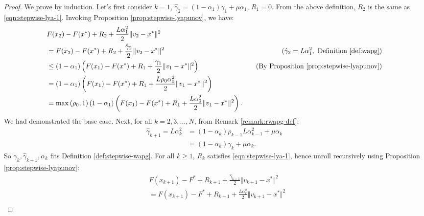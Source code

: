 \documentclass[12pt]{article}
\begin{document}
    \begin{proof}
        We prove by induction.
        Let's first consider $k = 1$, $\hat \gamma_2 = (1 - \alpha_1)\gamma_1 + \mu \alpha_1$, $R_1 = 0$.
        From the above definition, $R_2$ is the same as \eqref{eqn:stepwise-lya-1}.
        Invoking Proposition \ref{prop:stepwise-lyapunov}, we have:
        \begin{align*}
            & F(x_{2}) - F(x^*) + R_2 + \frac{L \alpha_1^2}{2}\Vert v_{2} - x^*\Vert^2
            \\
            & = F(x_{2}) - F(x^*) + R_2 + \frac{\hat \gamma_{2}}{2}\Vert v_{2} - x^*\Vert^2
            & (\hat \gamma_2 = L \alpha_1^2 , \text{ Definition \ref{def:wapg}})
            \\
            &\le
            (1 - \alpha_1)\left(
                F(x_1) - F(x^*) + R_1 + \frac{\gamma_1}{2}\Vert v_1 - x^*\Vert^2
            \right)
            & \quad \text{(By Proposition \ref{prop:stepwise-lyapunov})}
            \\
            &=
            (1 - \alpha_1)\left(
                F(x_1) - F(x^*) + R_1 + \frac{L\rho_{0}\alpha_{0}^2}{2}\Vert v_1 - x^*\Vert^2
            \right)
            \\
            &= \max\left(\rho_0, 1\right)
            (1 - \alpha_1)\left(
                F(x_1) - F(x^*) + R_1 + \frac{L\alpha_0^2}{2}\Vert v_1 - x^*\Vert^2
            \right).
        \end{align*}
        We had demonstrated the base case.
        Next, for all $k = 2, 3, \ldots, N$, from Remark \ref{remark:rwapg-def}:
        \begin{align*}
            \hat \gamma_{k + 1} = L\alpha_{k}^2
            &=(1 - \alpha_k)\rho_{k - 1}L\alpha_{k - 1}^2 + \mu\alpha_k
            \\
            &= (1 - \alpha_k)\gamma_k + \mu\alpha_k.
        \end{align*}
        So $\gamma_k, \hat \gamma_{k + 1}, \alpha_k$ fits Definition \ref{def:stepwise-wapg}.
        For all $k \ge 1$, $R_k$ satisfies \eqref{eqn:stepwise-lya-1}, hence unroll recursively using Proposition \ref{prop:stepwise-lyapunov}:
        {\small
        \begin{align*}
            &
            F(x_{k + 1}) - F^* + R_{k + 1} + \frac{\hat\gamma_{k + 1}}{2}\Vert v_{k + 1} - x^*\Vert^2
            \\
            &=
            F(x_{k + 1}) - F^* + R_{k + 1} + \frac{L \alpha_k^2}{2}\Vert v_{k + 1} - x^*\Vert^2
            \\

\end{align*}}
\end{proof}
\end{document}
